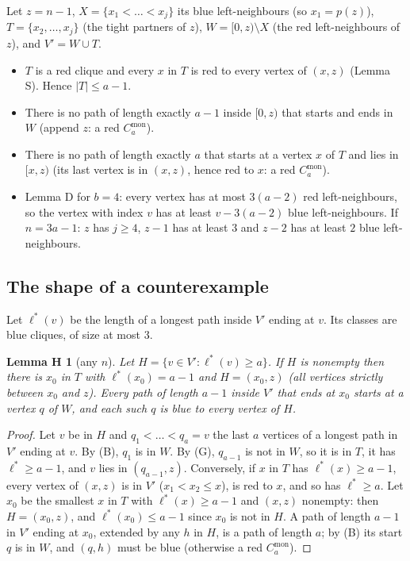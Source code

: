 \documentclass[11pt]{article}
\newcommand{\Cmon}[1]{C_{#1}^{\mathrm{mon}}}
\theoremstyle{plain}
\newtheorem*{lemmaH}{Lemma H}
\theoremstyle{remark}
\begin{document}
Let $z = n-1$, $X = \{x_1 < \dots < x_j\}$ its blue left-neighbours (so $x_1 = p(z)$), $T = \{x_2, \dots, x_j\}$
(the tight partners of $z$), $W = [0, z) \setminus X$ (the red left-neighbours of $z$), and $V' = W \cup T$.
\begin{itemize}
  \item $T$ is a red clique and every $x$ in $T$ is red to every vertex of $(x, z)$ (Lemma S). Hence
  $|T| \leq a-1$.
  \item[(G)] There is no path of length exactly $a-1$ inside $[0, z)$ that starts and ends in $W$ (append $z$: a
  red $\Cmon{a}$).
  \item[(B)] There is no path of length exactly $a$ that starts at a vertex $x$ of $T$ and lies in $[x, z)$ (its
  last vertex is in $(x, z)$, hence red to $x$: a red $\Cmon{a}$).
  \item Lemma D for $b = 4$: every vertex has at most $3(a-2)$ red left-neighbours, so the vertex with index $v$ has
  at least $v - 3(a-2)$ blue left-neighbours. If $n = 3a-1$: $z$ has $j \geq 4$, $z-1$ has at least $3$ and $z-2$
  has at least $2$ blue left-neighbours.
\end{itemize}

\subsection{The shape of a counterexample}

Let $\ell^*(v)$ be the length of a longest path inside $V'$ ending at $v$. Its classes are blue cliques, of size at
most $3$.

\begin{lemmaH}[any $n$]
Let $H = \{v \in V' : \ell^*(v) \geq a\}$. If $H$ is nonempty then there is $x_0$ in $T$ with $\ell^*(x_0) = a-1$
and $H = (x_0, z)$ (all vertices strictly between $x_0$ and $z$). Every path of length $a-1$ inside $V'$ that ends
at $x_0$ starts at a vertex $q$ of $W$, and each such $q$ is blue to every vertex of $H$.
\end{lemmaH}

\begin{proof}
Let $v$ be in $H$ and $q_1 < \dots < q_a = v$ the last $a$ vertices of a longest path in $V'$ ending at $v$. By
(B), $q_1$ is in $W$. By (G), $q_{a-1}$ is not in $W$, so it is in $T$, it has $\ell^* \geq a-1$, and $v$ lies in
$(q_{a-1}, z)$. Conversely, if $x$ in $T$ has $\ell^*(x) \geq a-1$, every vertex of $(x, z)$ is in $V'$
($x_1 < x_2 \leq x$), is red to $x$, and so has $\ell^* \geq a$. Let $x_0$ be the smallest $x$ in $T$ with
$\ell^*(x) \geq a-1$ and $(x, z)$ nonempty: then $H = (x_0, z)$, and $\ell^*(x_0) \leq a-1$ since $x_0$ is not in
$H$. A path of length $a-1$ in $V'$ ending at $x_0$, extended by any $h$ in $H$, is a path of length $a$; by (B)
its start $q$ is in $W$, and $(q, h)$ must be blue (otherwise a red $\Cmon{a}$).
\end{proof}
\end{document}
